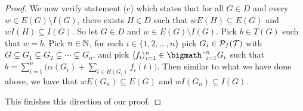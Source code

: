\begin{proof}
  We now verify statement (c) which states that for all $G \in D$ and every $w \in E(G) \setminus I(G)$, there exists $H \in D$ such that $wE(H) \subseteq E(G)$ and $wI(H) \subseteq I(G)$.
  So let $G \in D$ and $w \in E(G) \setminus I(G)$. 
  Pick $b \in T(G)$ such that $w = \overline{b}$. 
  Pick $n \in \mathbb{N}$, for each $i \in \{1, 2, \ldots, n\}$ pick $G_i \in \mathcal{P}_f(\mathcal{T})$ with $G \subsetneq G_1 \subsetneq G_2 \subsetneq \cdots \subsetneq G_n$, and pick $\la f_i \ra_{i=1}^n \in \bigtimes_{i=1}^n G_i$ such that $b = \sum_{i=1}^n \bigl( \alpha(G_i) + \sum_{t \in H(G_i)} f_i(t)\bigr)$. 
  Then similar to what we have done above, we have that $wE(G_n) \subseteq E(G)$ and $wI(G_n) \subseteq I(G)$.

  This finishes this direction of our proof. 
\end{proof}

 \theendnotes
